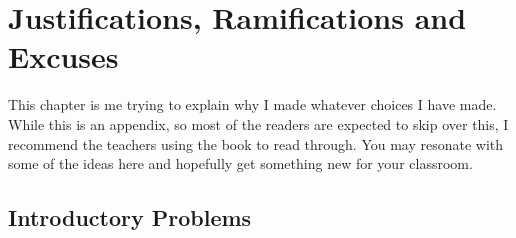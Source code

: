 \chapter{Justifications, Ramifications and Excuses}
This chapter is me trying to explain why I made whatever choices I have made. While this is an appendix, so most of the readers are expected to skip over this, I recommend the teachers using the book to read through. You may resonate with some of the ideas here and hopefully get something new for your classroom.\\
\section{Introductory Problems}